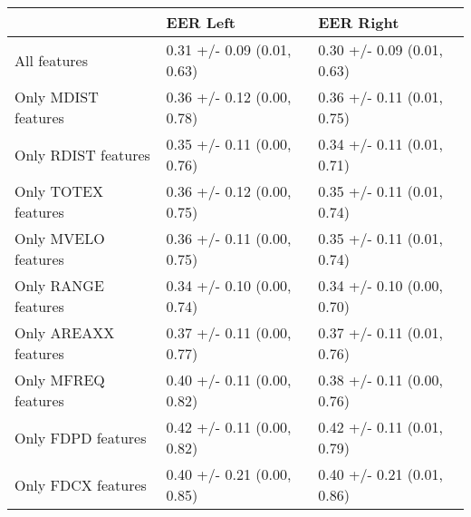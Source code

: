 \begin{tabular}{lll}
\toprule
{} &                    EER Left &                   EER Right \\
\midrule
All features         &  0.31 +/- 0.09 (0.01, 0.63) &  0.30 +/- 0.09 (0.01, 0.63) \\
Only MDIST features  &  0.36 +/- 0.12 (0.00, 0.78) &  0.36 +/- 0.11 (0.01, 0.75) \\
Only RDIST features  &  0.35 +/- 0.11 (0.00, 0.76) &  0.34 +/- 0.11 (0.01, 0.71) \\
Only TOTEX features  &  0.36 +/- 0.12 (0.00, 0.75) &  0.35 +/- 0.11 (0.01, 0.74) \\
Only MVELO features  &  0.36 +/- 0.11 (0.00, 0.75) &  0.35 +/- 0.11 (0.01, 0.74) \\
Only RANGE features  &  0.34 +/- 0.10 (0.00, 0.74) &  0.34 +/- 0.10 (0.00, 0.70) \\
Only AREAXX features &  0.37 +/- 0.11 (0.00, 0.77) &  0.37 +/- 0.11 (0.01, 0.76) \\
Only MFREQ features  &  0.40 +/- 0.11 (0.00, 0.82) &  0.38 +/- 0.11 (0.00, 0.76) \\
Only FDPD features   &  0.42 +/- 0.11 (0.00, 0.82) &  0.42 +/- 0.11 (0.01, 0.79) \\
Only FDCX features   &  0.40 +/- 0.21 (0.00, 0.85) &  0.40 +/- 0.21 (0.01, 0.86) \\
\bottomrule
\end{tabular}
